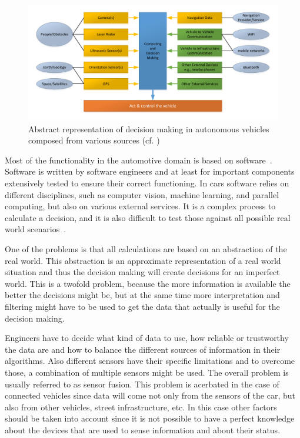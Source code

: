 \begin{figure}
\centering
\includegraphics[width=1\linewidth]{Figures/Figures_V20171008_DecisionMaking.pdf}
\caption{Abstract representation of decision making in autonomous vehicles composed from various sources (cf.  \cite{EarthImagingJournalEIJ:RemoteSensingSatelliteImages2012,Waldrop2015,Waymo2017technology,Tesla2016_upgrade})}
\label{fig:DecisionMaking}
\end{figure}

Most of the functionality in the automotive domain is based on software~\cite{Broy2007}. Software is written by software engineers and at least for important components extensively tested to ensure their correct functioning. In  cars software relies on different disciplines, such as computer vision, machine learning, and parallel computing, but also on various external services. It is a complex process to calculate a decision, and it is also difficult to test those against all possible real world scenarios~\cite{Waldrop2015}. 

One of the problems is that all calculations are based on an abstraction of the real world. This abstraction is an approximate representation of a real world situation and thus the decision making will create decisions for an imperfect world. This is a twofold problem, because the more information is available the better the decisions might be, but at the same time more interpretation and filtering might have to be used to get the data that actually is useful for the decision making. 

Engineers have to decide what kind of data to use, how reliable or trustworthy the data are and how to balance the different sources of information in their algorithms. Also different sensors have their specific limitations and to overcome those, a combination of multiple sensors might be used. The overall problem is usually referred to as sensor fusion. This problem is acerbated in the case of connected vehicles since data will come not only from the sensors of the car, but also from other vehicles, street infrastructure, etc. In this case other factors should be taken into account since it is not possible to have a perfect knowledge about the devices that are used to sense information and about their status.

